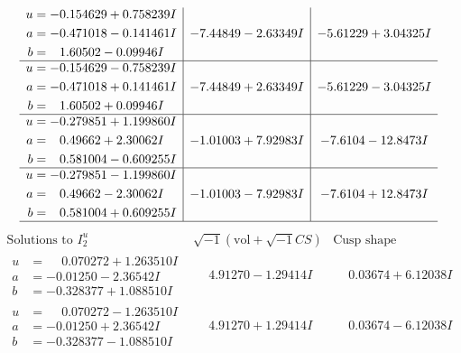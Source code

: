\documentclass[1p]{elsarticle_modified}
\theoremstyle{definition}
\newcommand{\I}{\sqrt{-1}}
\begin{document}
$$\begin{array}{c|c|c}
\begin{aligned}
u &= -0.154629 + 0.758239 I \\
a &= -0.471018 - 0.141461 I \\
b &= \phantom{-}1.60502 - 0.09946 I\end{aligned}
 & -7.44849 - 2.63349 I & -5.61229 + 3.04325 I \\ \hline\begin{aligned}
u &= -0.154629 - 0.758239 I \\
a &= -0.471018 + 0.141461 I \\
b &= \phantom{-}1.60502 + 0.09946 I\end{aligned}
 & -7.44849 + 2.63349 I & -5.61229 - 3.04325 I \\ \hline\begin{aligned}
u &= -0.279851 + 1.199860 I \\
a &= \phantom{-}0.49662 + 2.30062 I \\
b &= \phantom{-}0.581004 - 0.609255 I\end{aligned}
 & -1.01003 + 7.92983 I & -7.6104 - 12.8473 I \\ \hline\begin{aligned}
u &= -0.279851 - 1.199860 I \\
a &= \phantom{-}0.49662 - 2.30062 I \\
b &= \phantom{-}0.581004 + 0.609255 I\end{aligned}
 & -1.01003 - 7.92983 I & -7.6104 + 12.8473 I\\
 \hline 
 \end{array}$$\newpage$$\begin{array}{c|c|c}  
\text{Solutions to }I^u_{2}& \I (\text{vol} + \sqrt{-1}CS) & \text{Cusp shape}\\
 \hline 
\begin{aligned}
u &= \phantom{-}0.070272 + 1.263510 I \\
a &= -0.01250 - 2.36542 I \\
b &= -0.328377 + 1.088510 I\end{aligned}
 & \phantom{-}4.91270 - 1.29414 I & \phantom{-}0.03674 + 6.12038 I \\ \hline\begin{aligned}
u &= \phantom{-}0.070272 - 1.263510 I \\
a &= -0.01250 + 2.36542 I \\
b &= -0.328377 - 1.088510 I\end{aligned}
 & \phantom{-}4.91270 + 1.29414 I & \phantom{-}0.03674 - 6.12038 I \\ \hline\begin{aligned}

\end{aligned}
\end{array}$$
\end{document}
